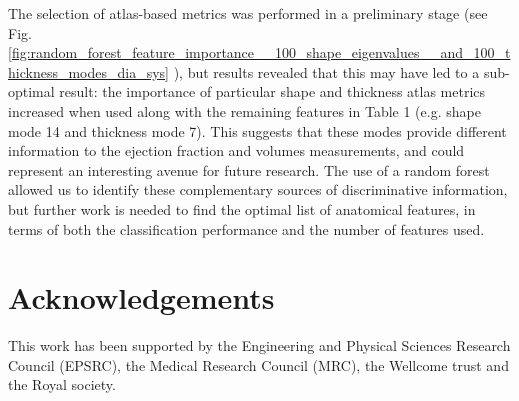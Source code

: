 \documentclass{llncs}
\begin{document}
The selection of atlas-based metrics was performed in a preliminary stage (see Fig. \ref{fig:random_forest_feature_importance__100_shape_eigenvalues__and_100_thickness_modes_dia_sys} ), but results revealed that this may have led to a sub-optimal result: the importance of particular shape and thickness atlas metrics increased when used along with the remaining features in Table 1 (e.g. shape mode 14 and thickness mode 7). This suggests that these modes provide different information to the ejection fraction and volumes measurements, and could represent an interesting avenue for future research. The use of a random forest allowed us to identify these complementary sources of discriminative information, but further work is needed to find the optimal list of anatomical features, in terms of both the classification performance and the number of features used.


\section{Acknowledgements}
This work has been supported by the Engineering and Physical Sciences Research Council (EPSRC), the Medical Research Council (MRC), the Wellcome trust and the Royal society.


\end{document}
